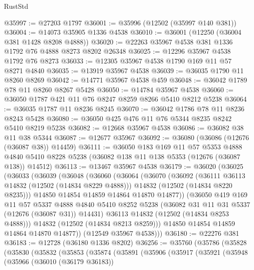 \begin{lexlean}{RustStd}
\begin{coremodule}
@35997 := @27203 @1797
@36001 := @35996 (@12502 (@35997 @140 @381))
@36004 := @14073 @35905 @1336 @4538
@36010 := @36001 (@12250 (@36004 @381 @1428 @8208 @4888))
@36020 := @22263 @35967 @4538 @381 @1336 @1792 @76 @4888 @8273 @8202 @26348
@36025 := @12296 @35967 @4538 @1792 @76 @8273
@36033 := @12305 @35967 @4538 @1790 @169 @11 @57 @8271 @4840
@36035 := @13919 @35967 @4538
@36039 := @36035 @1790 @11 @8260 @8269
@36042 := @14771 @35967 @4538 @459
@36048 := @36042 @1789 @78 @11 @8260 @8267 @5428
@36050 := @14784 @35967 @4538
@36060 := @36050 @1787 @421 @11 @76 @8247 @8259 @8266 @5410 @8212 @5238
@36064 := @36035 @1787 @11 @8236 @8245
@36070 := @36042 @1786 @78 @11 @8236 @8243 @5428
@36080 := @36050 @425 @476 @11 @76 @5344 @8235 @8242 @5410 @8219 @5238
@36082 := @12668 @35967 @4538
@36086 := @36082 @38 @11 @38 @5344
@36087 := @12677 @35967
@36092 := @36080 (@36086 (@12676 (@36087 @38)) @14459)
@36111 := @36050
    @183
    @169
    @11
    @57
    @5353
    @4888
    @4840
    @5410
    @8228
    @5238
    (@36082 @138 @11 @138 @5353 (@12676 (@36087 @138)) @14512)
@36113 := @13467 @35967 @4538
@36179 := @36020
    (@36025
      (@36033
        (@36039
          (@36048
            (@36060
              (@36064
                (@36070
                  (@36092
                    (@36111 @36113 @14832 (@12502 (@14834 @8229 @4888)))
                    @14832
                    (@12502 (@14834 @8220 @8235)))
                  @14850
                  @14854
                  @14859
                  @14864
                  @14870
                  @14877))
              (@36050
                @419
                @169
                @11
                @57
                @5337
                @4888
                @4840
                @5410
                @8252
                @5238
                (@36082 @31 @11 @31 @5337 (@12676 (@36087 @31)) @14431)
                @36113
                @14832
                (@12502 (@14834 @8253 @4888)))
              @14832
              (@12502 (@14834 @8213 @8259)))
            @14850
            @14854
            @14859
            @14864
            @14870
            @14877))
        (@12549 @35967 @4538)))
@36180 := @22276 @381
@36183 := @12728 (@36180 @1336 @8202)
@36256 := @35760
    (@35786
      (@35828
        (@35830
          (@35832
            (@35853
              (@35874
                (@35891
                  (@35906
                    (@35917
                      (@35921
                        (@35948
                          (@35966
                            (@36010 (@36179 @36183))

\end{coremodule}
\end{lexlean}
